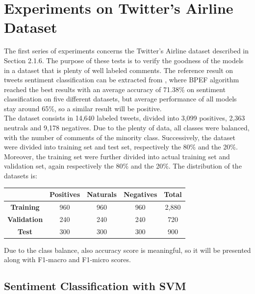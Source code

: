 \section{Experiments on Twitter's Airline Dataset}

The first series of experiments concerns the Twitter's Airline dataset described in Section 2.1.6. The purpose of these tests is to verify the goodness of the models in a dataset that is plenty of well labeled comments. The reference result on tweets sentiment classification can be extracted from \cite{Zimbra:2018:STS:3210372.3185045}, where BPEF algorithm reached the best results with an average accuracy of 71.38\% on sentiment classification on five different datasets, but average performance of all models stay around 65\%, so a similar result will be positive.\\
The dataset consists in 14,640 labeled tweets, divided into 3,099 positives, 2,363 neutrals and 9,178 negatives. Due to the plenty of data, all classes were balanced, with the number of comments of the minority class. Successively, the dataset were divided into training set and test set, respectively the 80\% and the 20\%. Moreover, the training set were further divided into actual training set and validation set, again respectively the 80\% and the 20\%. The distribution of the datasets is:

\begin{center}
	\begin{tabular}{ | c  c  c  c | c | } 
		\hline
		& \textbf{Positives} & \textbf{Naturals} & \textbf{Negatives} & \textbf{Total} \\
		\hline
		\textbf{Training} & 960 & 960 & 960 & 2,880 \\ 
		\hline
		\textbf{Validation} & 240 & 240 & 240 & 720 \\ 
		\hline
		\textbf{Test} & 300 & 300 & 300 & 900 \\
		\hline
	\end{tabular}
\end{center}

Due to the class balance, also accuracy score is meaningful, so it will be presented along with F1-macro and F1-micro scores.


\subsection{Sentiment Classification with SVM}

